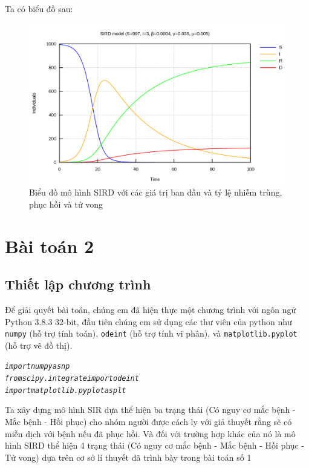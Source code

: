 \documentclass[a4paper]{article}
\begin{document}
Ta có biểu đồ sau: 
\begin{center}
    \begin{figure}[htp]
    \begin{center}
     \includegraphics[scale=.15]{Images/img1.3.PNG}
    \end{center}
    \caption{Biểu đồ mô hình SIRD với các giá trị ban đầu và tỷ lệ nhiễm trùng, phục hồi và tử vong}
    \label{refhinh3}
    \end{figure}
\end{center}

\newpage
\section{Bài toán 2}
\subsection{Thiết lập chương trình}
Để giải quyết bài toán, chúng em đã hiện thực một chương trình với ngôn ngữ Python 3.8.3 32-bit, đầu tiên chúng em sử dụng các thư viên của python như {\tt numpy} (hỗ trợ tính toán),  {\tt odeint} (hỗ trợ tính vi phân), và {\tt matplotlib.pyplot} (hỗ trợ vẽ đồ thị).

\begin{mdframed}[hidealllines=true,backgroundcolor=magenta!10]
\begin{alltt}
\textit{
import numpy as np
from scipy.integrate import odeint
import matplotlib.pyplot as plt
}
\end{alltt}
\end{mdframed}

Ta xây dựng mô hình SIR dựa thể hiện ba trạng thái (Có nguy cơ mắc bệnh - Mắc bệnh - Hồi phục) cho nhóm người được cách ly với giả thuyết rằng sẽ có miễn dịch với bệnh nếu đã phục hồi. Và đối với trường hợp khác của nó là mô hình SIRD thể hiện 4 trạng thái (Có nguy cơ mắc bệnh - Mắc bệnh - Hồi phục - Tử vong) dựa trên cơ sở lí thuyết đã trình bày trong bài toán số 1
\end{document}
